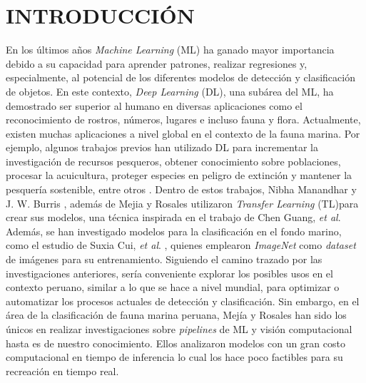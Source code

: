\chapter{INTRODUCCI\'ON}

En los últimos años \textit{Machine Learning} (ML) ha ganado  
mayor importancia debido a su capacidad para aprender patrones, 
realizar regresiones y, especialmente, al potencial de los diferentes 
modelos de detección y clasificación de objetos. En este contexto, \textit{Deep Learning} (DL), 
una subárea del ML, ha demostrado ser superior al humano en diversas 
aplicaciones como el reconocimiento de rostros, números, lugares e incluso fauna y flora.
\newline
\newline
Actualmente, existen muchas aplicaciones a nivel global en el contexto de la fauna marina. 
Por ejemplo, algunos trabajos previos han utilizado DL para incrementar la investigación de 
recursos pesqueros, obtener conocimiento sobre poblaciones, procesar la acuicultura, proteger 
especies en peligro de extinción y mantener la pesquería sostenible, entre otros
\cite{10.1145/3419635.3419643, 10.1145/3325917.3325934,20.500.12724/11174,8371919}.
\newline
\newline
Dentro de estos trabajos, Nibha Manandhar y J. W. Burris , además de 
Mejia y Rosales utilizaron \textit{Transfer Learning} (TL)para crear sus modelos, 
una técnica inspirada en el trabajo de Chen Guang, 
\textit{et al}. Además, se han investigado modelos para la 
clasificación en el fondo marino, como el estudio de Suxia Cui, 
\textit{et al}. \cite{Cui2020}, quienes emplearon \textit{ImageNet} \cite{ImageNet} como 
\textit{dataset} de imágenes para su entrenamiento. 
\newline
\newline
Siguiendo el camino trazado por las investigaciones anteriores, sería conveniente explorar 
los posibles usos en el contexto peruano, similar a lo que se hace a nivel 
mundial, para optimizar o automatizar los procesos actuales de detección y 
clasificación. Sin embargo, en el área de la clasificación de fauna marina 
peruana, Mejía y Rosales han sido los únicos en 
realizar investigaciones sobre \textit{pipelines} de ML y visión 
computacional hasta es de nuestro conocimiento. Ellos analizaron modelos con 
un gran costo computacional en tiempo de inferencia lo cual los hace poco 
factibles para su recreación en tiempo real. 
\newline
\newline
